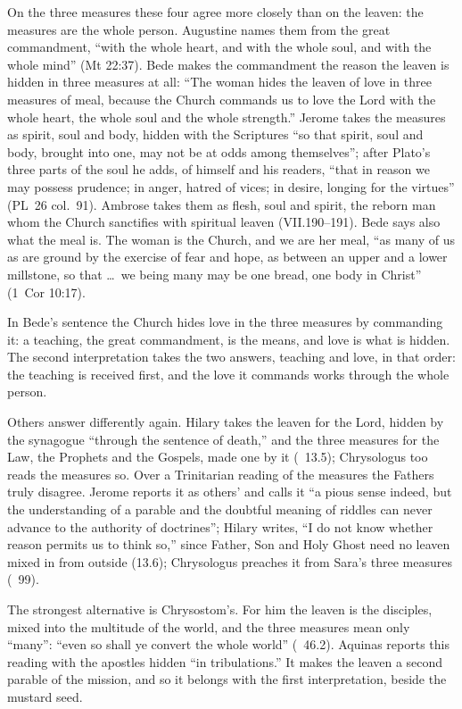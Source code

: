 On the three measures these four agree more closely than on the leaven: the
measures are the whole person. Augustine names them from the great
commandment, ``with the whole heart, and with the whole soul, and with the
whole mind'' (Mt 22:37). Bede makes the commandment the reason the leaven is
hidden in three measures at all: ``The woman hides the leaven of love in three
measures of meal, because the Church commands us to love the Lord with the
whole heart, the whole soul and the whole strength.'' Jerome takes the
measures as spirit, soul and body, hidden with the Scriptures ``so that spirit,
soul and body, brought into one, may not be at odds among themselves''; after
Plato's three parts of the soul he adds, of himself and his readers, ``that in
reason we may possess prudence; in anger, hatred of vices; in desire, longing
for the virtues'' (PL~26 col.~91). Ambrose takes them as flesh, soul and
spirit, the reborn man whom the Church sanctifies with spiritual leaven
(VII.190--191). Bede says also what the meal is. The woman is the Church, and
we are her meal, ``as many of us as are ground by the exercise of fear and
hope, as between an upper and a lower millstone, so that \dots\ we being many
may be one bread, one body in Christ'' (1~Cor 10:17).

In Bede's sentence the Church hides love in the three measures by commanding
it: a teaching, the great commandment, is the means, and love is what is
hidden. The second interpretation takes the two answers, teaching and love,
in that order: the teaching is received first, and the love it commands works
through the whole person.

Others answer differently again. Hilary takes the leaven for the Lord, hidden
by the synagogue ``through the sentence of death,'' and the three measures for
the Law, the Prophets and the Gospels, made one by it (~13.5); Chrysologus too reads the measures so. Over a Trinitarian
reading of the measures the Fathers truly disagree. Jerome reports it as
others' and calls it ``a pious sense indeed, but the understanding of a parable
and the doubtful meaning of riddles can never advance to the authority of
doctrines''; Hilary writes, ``I do not know whether reason permits us to think
so,'' since Father, Son and Holy Ghost need no leaven mixed in from outside
(13.6); Chrysologus preaches it from Sara's three measures (~99).

The strongest alternative is Chrysostom's. For him the leaven is the
disciples, mixed into the multitude of the world, and the three measures mean
only ``many'': ``even so shall ye convert the whole world'' (~46.2). Aquinas reports this reading with the apostles hidden ``in
tribulations.'' It makes the leaven a second parable of the mission, and so it
belongs with the first interpretation, beside the mustard seed.

